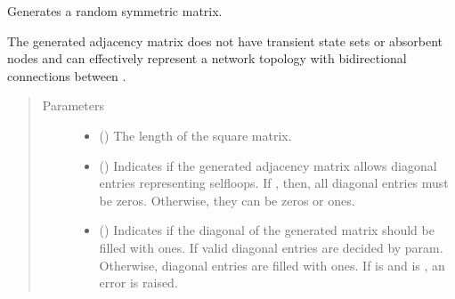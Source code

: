 \documentclass[letterpaper,10pt,english]{sphinxmanual}
\begin{document}

\begin{fulllineitems}
\label{\detokenize{app.domain.helpers:app.domain.helpers.matrices.new_symmetric_matrix}}
Generates a random symmetric matrix.

The generated adjacency matrix does not have transient state sets or
absorbent nodes and can effectively represent a network topology
with bidirectional connections between {\hyperref[\detokenize{app.domain:app.domain.network_nodes.Node}]{}}.
\begin{quote}\begin{description}
\item[{Parameters}] \leavevmode\begin{itemize}
\item {} 
 () \textendash{} The length of the square matrix.

\item {} 
 () \textendash{} Indicates if the generated adjacency matrix allows diagonal
entries representing self\sphinxhyphen{}loops. If , then, all diagonal
entries must be zeros. Otherwise, they can be zeros or ones.

\item {} 
 () \textendash{} Indicates if the diagonal of the generated matrix should be
filled with ones. If  valid diagonal entries are
decided by  param. Otherwise, diagonal entries
are filled with ones. If  is 
and  is , an error is raised.


\end{itemize}
\end{description}
\end{quote}
\end{fulllineitems}
\end{document}
